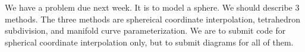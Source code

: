 \documentclass{article}
\begin{document}
We have a problem due next week. It is to model a sphere. We should describe 3
methods. The three methods are sphereical coordinate interpolation, tetrahedron
subdivision, and manifold curve parameterization. We are to submit code for
spherical coordinate interpolation only, but to submit diagrams for all of them. 
\end{document}
